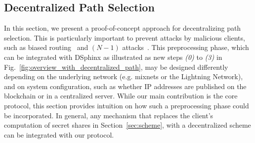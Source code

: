 
\subsection{Decentralized Path Selection}
\label{sec:distrib-path}
In this section, we present a proof-of-concept approach for decentralizing path selection. This is particularly important to prevent attacks by malicious clients, such as biased routing~\cite{benguirat2022mixnet} and $(N-1)$ attacks~\cite{wright03}. This preprocessing phase, which can be integrated with DSphinx as illustrated as new steps \emph{(0)} to \emph{(3)} in Fig.~\ref{fig:overview_with_decentralized_path}, may be designed differently depending on the underlying network (e.g. mixnets or the Lightning Network), and on system configuration, such as whether IP addresses are published on the blockchain or in a centralized server. While our main contribution is the core protocol, this section provides intuition on how such a preprocessing phase could be incorporated. In general, any mechanism that replaces the client’s computation of secret shares in Section~\ref{sec:scheme}, with a decentralized scheme can be integrated with our protocol.
